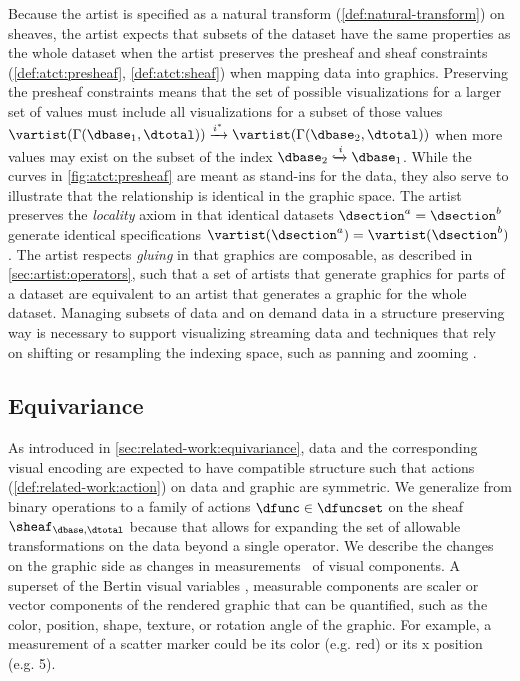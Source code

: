 \documentclass[journal]{IEEEtran}
\theoremstyle{definition}
\theoremstyle{remark}
\begin{document}
Because the artist is specified as a natural transform (\autoref{def:natural-transform}) on sheaves, the artist expects that subsets of the dataset have the same properties as the whole dataset when the artist preserves the presheaf and sheaf constraints (\autoref{def:atct:presheaf}, \autoref{def:atct:sheaf}) when mapping data into graphics. Preserving the presheaf constraints means that the set of possible visualizations for a larger set of values must include all visualizations for a subset of those values  $\vartist(\Gamma(\dbase_1, \dtotal)) \xrightarrow{i^*} \vartist(\Gamma(\dbase_2, \dtotal))$ when more values may exist on the subset of the index $\dbase_2 \xhookrightarrow{i} \dbase_1$. While the curves in \autoref{fig:atct:presheaf} are meant as stand-ins for the data, they also serve to illustrate that the relationship is identical in the graphic space. The artist preserves the \textit{locality} axiom in that identical datasets $\dsection^{a} = \dsection^{b}$ generate identical specifications $\vartist(\dsection^a) = \vartist(\dsection^b)$. The artist respects \textit{gluing} in that graphics are composable, as described in \autoref{sec:artist:operators}, such that a set of artists that generate graphics for parts of a dataset are equivalent to an artist that generates a graphic for the whole dataset. Managing subsets of data and on demand data in a structure preserving way is necessary to support visualizing streaming data \cite{krstajicVisualizationStreamingData2013} and techniques that rely on shifting or resampling the indexing space, such as  panning and zooming \cite{NekrasovskiEvaluationPanZoom2006}.

\subsection{Equivariance}
\label{sec:artist:equiv}
As introduced in \autoref{sec:related-work:equivariance}, data and the corresponding visual encoding are expected to have compatible structure such that actions (\autoref{def:related-work:action}) on data and graphic are symmetric. We generalize from binary operations to a family of actions $\dfunc \in \dfuncset$ on the sheaf $\sheaf_{\dbase, \dtotal}$ because that allows for expanding the set of allowable transformations on the data beyond a single operator. We describe the changes on the graphic side as changes in \textcolor{monoid}{measurements} \measurec\ of visual components. A superset of the Bertin visual variables \cite{bertinIIPropertiesGraphic2011}, measurable components are scaler or vector components of the rendered graphic that can be quantified, such as the color, position, shape, texture, or rotation angle of the graphic. For example, a measurement of a scatter marker could be its color (e.g. red) or its x position (e.g. 5).
\end{document}
